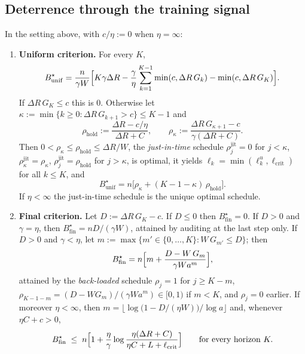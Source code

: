 \subsection{Deterrence through the training signal}

\begin{theorem}
\label{thm:audit-deterrence}
In the setting above, with $c/\eta:=0$ when $\eta=\infty$:
\begin{enumerate}
\item[\textup{(i)}] \textbf{Uniform criterion.} For every $K$,
\begin{equation}\label{eq:audit-unif-id}
  B^\star_{\mathrm{unif}}=\frac{n}{\gamma W}\Bigl[K\gamma\Delta R
   -\frac{\gamma}{\eta}\sum_{k=1}^{K-1}\min(c,\Delta R\,G_k)-\min(c,\Delta R\,G_K)\Bigr].
\end{equation}
If $\Delta R\,G_K\le c$ this is $0$. Otherwise let
$\kappa:=\min\{k\ge0:\Delta R\,G_{k+1}>c\}\le K-1$ and
\[
  \rho_{\mathrm{hold}}:=\frac{\Delta R-c/\eta}{\Delta R+C},\qquad
  \rho_\kappa:=\frac{\Delta R\,G_{\kappa+1}-c}{\gamma(\Delta R+C)} .
\]
Then $0<\rho_\kappa\le\rho_{\mathrm{hold}}\le\Delta R/W$, the
\emph{just-in-time} schedule
$\rho^{\mathrm{jit}}_j=0$ for $j<\kappa$, $\rho^{\mathrm{jit}}_\kappa=\rho_\kappa$,
$\rho^{\mathrm{jit}}_j=\rho_{\mathrm{hold}}$ for $j>\kappa$, is optimal, it yields
$\ell_k=\min(\ell^{u}_k,\ell_{\mathrm{crit}})$ for all $k\le K$, and
\begin{equation}\label{eq:audit-unif}
  B^\star_{\mathrm{unif}}=n\bigl[\rho_\kappa+(K-1-\kappa)\,\rho_{\mathrm{hold}}\bigr].
\end{equation}
If $\eta<\infty$ the just-in-time schedule is the unique optimal schedule.
\item[\textup{(ii)}] \textbf{Final criterion.} Let $D:=\Delta R\,G_K-c$. If
$D\le0$ then $B^\star_{\mathrm{fin}}=0$. If $D>0$ and $\gamma=\eta$, then
$B^\star_{\mathrm{fin}}=nD/(\gamma W)$, attained by auditing at the last step
only. If $D>0$ and $\gamma<\eta$, let
$m:=\max\{m'\in\{0,\dots,K\}: W\,G_{m'}\le D\}$; then
\begin{equation}\label{eq:audit-fin}
  B^\star_{\mathrm{fin}}=n\Bigl[m+\frac{D-W\,G_m}{\gamma W a^{m}}\Bigr],
\end{equation}
attained by the \emph{back-loaded} schedule $\rho_j=1$ for $j\ge K-m$,
$\rho_{K-1-m}=(D-WG_m)/(\gamma Wa^m)\in[0,1)$ if $m<K$, and $\rho_j=0$ earlier.
If moreover $\eta<\infty$, then
$m=\bigl\lfloor \log\bigl(1-D/(\eta W)\bigr)/\log a\bigr\rfloor$ and, whenever
$\eta C+c>0$,
\begin{equation}\label{eq:audit-fin-bound}
  B^\star_{\mathrm{fin}}\;\le\; n\Bigl[1+\frac{\eta}{\gamma}
  \log\frac{\eta(\Delta R+C)}{\eta C+L+\ell_{\mathrm{crit}}}\Bigr]
  \qquad\text{for every horizon }K .
\end{equation}
\end{enumerate}
\end{theorem}

